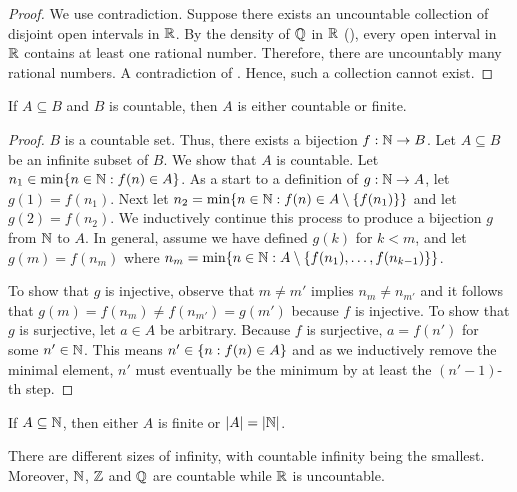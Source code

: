 \begin{proof}
  We use contradiction. Suppose there exists an uncountable
  collection of disjoint open intervals in $\mathbb R$. By the density of
  $\mathbb Q$ in $\mathbb R$ (), every open interval in
  $\mathbb R$ contains at least one rational number. Therefore, there are
  uncountably many rational numbers. A contradiction of
  . Hence, such a collection cannot exist.
\end{proof}

\begin{theorem}
  If $A \subseteq B$ and $B$ is countable, then $A$ is either
  countable or finite.
\end{theorem}

\begin{proof}
  $B$ is a countable set. Thus, there exists a bijection $f : \mathbb N \to
  B$. Let $A \subseteq B$ be an infinite subset of $B$. We show that
  $A$ is countable. Let $n_1 \in \min\{ n \in \mathbb N : f(n) \in A \}$.
  As a start to a definition of $g : \mathbb N \to A$, let $g(1) = f(n_1)$.
  Next let $n_2 = \min\{ n \in \mathbb N : f(n) \in A \setminus
  \{ f(n_1) \} \}$ and let $g(2) = f(n_2)$. We inductively continue
  this process to produce a bijection $g$ from $\mathbb N$ to $A$. In
  general, assume we have defined $g(k)$ for $k < m$, and let $g(m) =
  f(n_m)$ where $n_m = \min\{ n \in \mathbb N : A \setminus \{ f(n_1),
  \dots, f(n_{k - 1}) \} \}$.

  To show that $g$ is injective, observe that $m \neq m'$ implies
  $n_m \neq n_{m'}$ and it follows that $g(m) = f(n_m) \neq f(n_{m'})
  = g(m')$ because $f$ is injective. To show that $g$ is surjective,
  let $a \in A$ be arbitrary. Because $f$ is surjective, $a = f(n')$
  for some $n' \in \mathbb N$. This means $n' \in \{ n : f(n) \in A \}$ and
  as we inductively remove the minimal element, $n'$ must eventually
  be the minimum by at least the $(n' -1)$-th step.
\end{proof}

\begin{corollary}
  If $A \subseteq \mathbb N$, then either $A$ is finite or $| A | = | \mathbb N |$.
\end{corollary}

\begin{corollary}
  There are different sizes of infinity, with countable infinity
  being the smallest. Moreover, $\mathbb N$, $\mathbb Z$ and $\mathbb Q$ are countable
  while $\mathbb R$ is uncountable.
\end{corollary}

